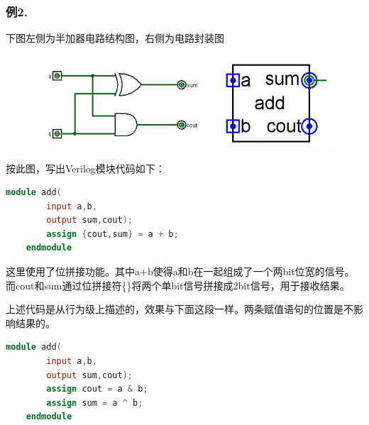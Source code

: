 \documentclass[UTF8]{article}
\begin{document}
	\subsubsection*{例2.}下图左侧为半加器电路结构图，右侧为电路封装图\par
	\begin{figure}[H]
		\centering
		\includegraphics[scale=0.7]{half-adder.jpg}
		\label{half-adder}
	\end{figure}\par
	按此图，写出Verilog模块代码如下：\par
	\begin{lstlisting}[language=Verilog]
	module add(
		input a,b,
		output sum,cout);
		assign {cout,sum} = a + b;
	endmodule
	\end{lstlisting}\par
	这里使用了位拼接功能。其中a+b使得a和b在一起组成了一个两bit位宽的信号。而cout和sum通过位拼接符\{\}将两个单bit信号拼接成2bit信号，用于接收结果。\par
	上述代码是从行为级上描述的，效果与下面这段一样。两条赋值语句的位置是不影响结果的。
	\begin{lstlisting}[language=Verilog]
	module add(
		input a,b,
		output sum,cout);
		assign cout = a & b;
		assign sum = a ^ b;
	endmodule
	\end{lstlisting}\par
	
\end{document}
